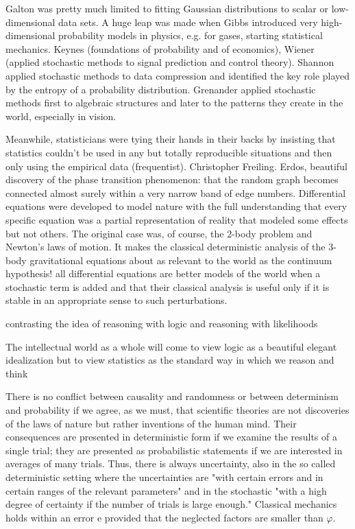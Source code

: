 \documentclass[onecollarge,runningheads]{svjour2}
\begin{document}
{Galton was pretty much
limited to fitting Gaussian distributions to scalar or low-dimensional data
sets. A huge leap was made when Gibbs introduced very high-dimensional probability models in physics, e.g. for gases, starting statistical mechanics. Keynes (foundations of probability and of economics), Wiener (applied stochastic methods to signal prediction and
control theory). Shannon applied stochastic methods to data compression
and identified the key role played by the entropy of a probability distribution. Grenander applied stochastic methods first to algebraic structures and later
to the patterns they create in the world, especially in vision.

Meanwhile, statisticians were tying their hands in their backs by insisting that statistics couldn't be used in any
but totally reproducible situations and then only using the empirical data (frequentist).
Christopher Freiling.
Erdos, beautiful discovery of the phase
transition phenomenon: that the random graph becomes connected almost
surely within a very narrow band of edge numbers. 
Differential equations were developed
to model nature with the full understanding that every specific equation
was a partial representation of reality that modeled some effects but not
others. The original case was, of course, the 2-body problem and Newton's
laws of motion.  It
makes the classical deterministic analysis of the 3-body gravitational
equations about as relevant to the world as the continuum hypothesis! all differential equations are better models of
the world when a stochastic term is added and that their classical analysis
is useful only if it is stable in an appropriate sense to such perturbations.

contrasting the idea of reasoning with logic and reasoning with likelihoods

The intellectual world as a
whole will come to view logic as a beautiful elegant idealization but to view
statistics as the standard way in which we reason and think







There is no conflict between causality and randomness or between determinism and probability if we agree, as we must, that scientific theories are not discoveries of the laws of nature but rather inventions of the human mind. Their consequences are presented in deterministic form if we examine the results of a single trial; they are presented as probabilistic statements if we are interested in averages of many trials. Thus, there is always uncertainty, also in the so called deterministic setting where the uncertainties are "with certain errors and in certain ranges of the relevant parameters" and in the stochastic "with a high degree of certainty if the number of trials is large enough." Classical mechanics holds within an error e provided that the neglected factors are smaller than $\varphi$.

}
\end{document}

